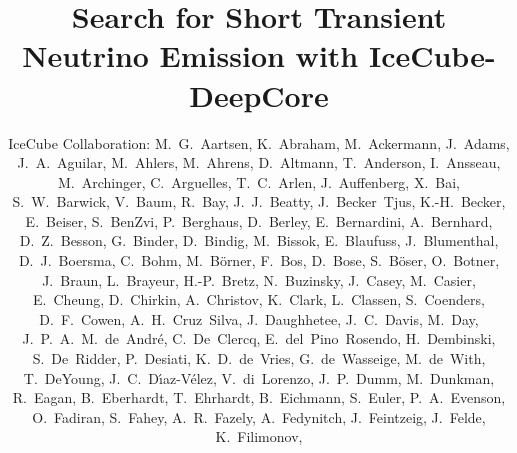 \documentclass[manuscript]{aastex}
\begin{document}
\title{Search for Short Transient Neutrino Emission with IceCube-DeepCore}
\author{
IceCube Collaboration:
M.~G.~Aartsen,
K.~Abraham,
M.~Ackermann,
J.~Adams,
J.~A.~Aguilar,
M.~Ahlers,
M.~Ahrens,
D.~Altmann,
T.~Anderson,
I.~Ansseau,
M.~Archinger,
C.~Arguelles,
T.~C.~Arlen,
J.~Auffenberg,
X.~Bai,
S.~W.~Barwick,
V.~Baum,
R.~Bay,
J.~J.~Beatty,
J.~Becker~Tjus,
K.-H.~Becker,
E.~Beiser,
S.~BenZvi,
P.~Berghaus,
D.~Berley,
E.~Bernardini,
A.~Bernhard,
D.~Z.~Besson,
G.~Binder,
D.~Bindig,
M.~Bissok,
E.~Blaufuss,
J.~Blumenthal,
D.~J.~Boersma,
C.~Bohm,
M.~B\"orner,
F.~Bos,
D.~Bose,
S.~B\"oser,
O.~Botner,
J.~Braun,
L.~Brayeur,
H.-P.~Bretz,
N.~Buzinsky,
J.~Casey,
M.~Casier,
E.~Cheung,
D.~Chirkin,
A.~Christov,
K.~Clark,
L.~Classen,
S.~Coenders,
D.~F.~Cowen,
A.~H.~Cruz~Silva,
J.~Daughhetee,
J.~C.~Davis,
M.~Day,
J.~P.~A.~M.~de~Andr\'e,
C.~De~Clercq,
E.~del~Pino~Rosendo,
H.~Dembinski,
S.~De~Ridder,
P.~Desiati,
K.~D.~de~Vries,
G.~de~Wasseige,
M.~de~With,
T.~DeYoung,
J.~C.~D{\'\i}az-V\'elez,
V.~di~Lorenzo,
J.~P.~Dumm,
M.~Dunkman,
R.~Eagan,
B.~Eberhardt,
T.~Ehrhardt,
B.~Eichmann,
S.~Euler,
P.~A.~Evenson,
O.~Fadiran,
S.~Fahey,
A.~R.~Fazely,
A.~Fedynitch,
J.~Feintzeig,
J.~Felde,
K.~Filimonov,
}
\end{document}
